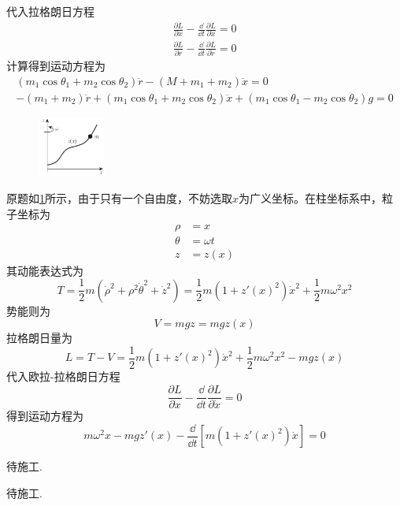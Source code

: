 \begin{solution}
	代入拉格朗日方程
	\begin{align*}
		\frac{\partial L}{\partial x}-\frac{\dd}{\dd t}\frac{\partial L}{\partial \dot{x}}=0\\
		\frac{\partial L}{\partial r}-\frac{\dd}{\dd t}\frac{\partial L}{\partial \dot{r}}=0
	\end{align*}
	计算得到运动方程为
	\begin{align*}
		(m_1\cos{\theta_1}+m_2\cos{\theta_2}) \ddot{r}-(M+m_1+m_2)\ddot{x}=0\\
		-(m_1+m_2)\ddot{r}+(m_1\cos{\theta_1}+m_2\cos{\theta_2})\ddot{x}+(m_1\cos{\theta_1}-m_2\cos{\theta_2})g=0
	\end{align*}
\end{solution}


\begin{solution}
    \begin{figure}[h]
    	\centering
    	\includegraphics[width=0.2\textwidth]{content/Figures/2-4}
    	\caption{ }
    	\label{fig:4-3}
    \end{figure}
    原题如\ref{fig:4-3}所示，由于只有一个自由度，不妨选取\(x\)为广义坐标。在柱坐标系中，粒子坐标为
    \begin{align*}
    	\rho&=x\\
    	\theta&=\omega t\\
    	z&=z(x)
    \end{align*}
    其动能表达式为
    \[T=\frac{1}{2}m(\dot{\rho}^2+\rho^2 \dot{\theta}^2+\dot{z}^2)=\frac{1}{2}m (1+z'(x)^2)\dot{x}^2+\frac{1}{2}m\omega^2 x^2\]
    势能则为
    \[V=mgz=mg z(x)\]
    拉格朗日量为
    \[L=T-V=\frac{1}{2}m (1+z'(x)^2)\dot{x}^2+\frac{1}{2}m\omega^2 x^2-mg z(x)\]
    代入欧拉-拉格朗日方程
    \[\frac{\partial L}{\partial x}-\frac{\dd}{\dd t}\frac{\partial L}{\partial \dot{x}}=0\]
    得到运动方程为
    \[m\omega^2 x-mgz'(x)-\frac{\dd}{\dd t}\left[m(1+z'(x)^2)\dot{x}\right]=0\]
\end{solution}


\problem{}
\begin{solution}
    待施工.
\end{solution}


\problem{}
\begin{solution}
    待施工.
\end{solution}


